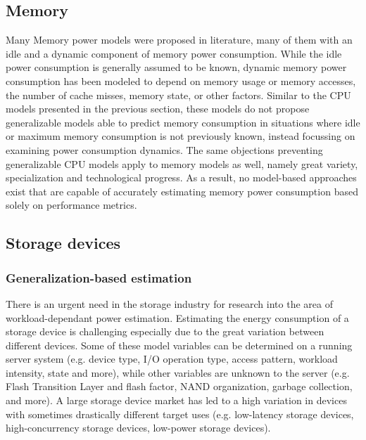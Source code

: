 \subsection{Memory}

Many Memory power models were proposed in literature, many of them with an idle and a dynamic component of memory power consumption. While the idle power consumption is generally assumed to be known, dynamic memory power consumption has been modeled to depend on memory usage\parencite{lin2018cloud} or memory accesses\parencite{arroba2014server}, the number of cache misses\parencite{kansal2010virtual}, memory state\parencite{basmadjianMethodologyPredictPower2011}, or other factors. Similar to the CPU models presented in the previous section, these models do not propose generalizable models able to predict memory consumption in situations where idle or maximum memory consumption is not previously known, instead focussing on examining power consumption dynamics. The same objections preventing generalizable CPU models apply to memory models as well, namely great variety, specialization and technological progress. As a result, no model-based approaches exist that are capable of accurately estimating memory power consumption based solely on performance metrics.

\subsection{Storage devices}
\label{sec:model-based_storage_power}

\subsubsection{Generalization-based estimation}
There is an urgent need in the storage industry for research into the area of workload-dependant power estimation\parencite{allaloufStorageModelingPower2009}. Estimating the energy consumption of a storage device is challenging especially due to the great variation between different devices. Some of these model variables can be determined on a running server system (e.g. device type, I/O operation type, access pattern, workload intensity, state and more), while other variables are unknown to the server (e.g. Flash Transition Layer and flash factor, NAND organization, garbage collection, and more). A large storage device market has led to a high variation in devices with sometimes drastically different target uses (e.g. low-latency storage devices, high-concurrency storage devices, low-power storage devices).

